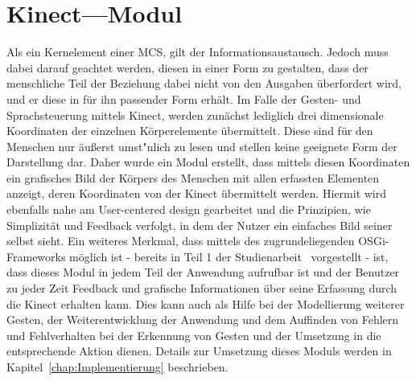 \section{Kinect---Modul}
Als ein Kernelement einer \gls{MCS}, gilt der Informationsaustausch. Jedoch muss dabei darauf geachtet werden, diesen in einer Form zu gestalten, dass der menschliche Teil der Beziehung dabei nicht von den Ausgaben \"uberfordert wird, und er diese in f\"ur ihn passender Form erh\"alt. Im Falle der Gesten- und Sprachsteuerung mittels Kinect, werden zun\"achst lediglich drei dimensionale Koordinaten der einzelnen K\"orperelemente \"ubermittelt. Diese sind f\"ur den Menschen nur \"au\ss erst umst\a"nlich zu lesen und stellen keine geeignete Form der Darstellung dar. Daher wurde ein Modul erstellt, dass mittels diesen Koordinaten ein grafisches Bild der K\"orpers des Menschen mit allen erfassten Elementen anzeigt, deren Koordinaten von der Kinect \"ubermittelt werden. Hiermit wird ebenfalls nahe am User-centered design gearbeitet und die Prinzipien, wie Simplizit\"at und Feedback verfolgt, in dem der Nutzer ein einfaches Bild seiner selbst sieht.
\newline
Ein weiteres Merkmal, dass mittels des zugrundeliegenden \gls{OSGi}-Frameworks m\"oglich ist - bereits in Teil 1 der Studienarbeit~\cite{bib:Ebner_Werling} vorgestellt - ist, dass dieses Modul in jedem Teil der Anwendung aufrufbar ist und der Benutzer zu jeder Zeit Feedback und grafische Informationen \"uber seine Erfassung durch die Kinect erhalten kann. Dies kann auch als Hilfe bei der Modellierung weiterer Gesten, der Weiterentwicklung der Anwendung und dem Auffinden von Fehlern und Fehlverhalten bei der Erkennung von Gesten und der Umsetzung in die entsprechende Aktion dienen.
\newline
Details zur Umsetzung dieses Moduls werden in Kapitel~\ref{chap:Implementierung} beschrieben.

